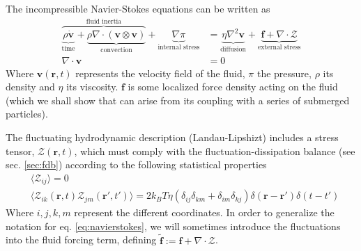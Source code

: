 \documentclass[ twoside,openright,titlepage,numbers=noenddot,%
headinclude,footinclude,cleardoublepage=empty,abstract=on,
BCOR=5mm,paper=a4,fontsize=11pt, dvipsnames
]{scrreprt}
\renewcommand{\vec}[1]{\bm{#1}}
\newcommand{\kT}{k_B T}
\newcommand{\fpos}{r}
\newcommand{\fvel}{v}
\begin{document}
The incompressible Navier-Stokes equations can be written as
\begin{equation}
  \label{eq:navierstokes}
  \begin{aligned}
    \overbrace{\underbrace{\rho\dot{\vec{\fvel}}}_{\text{time}} +\underbrace{\rho\nabla\cdot (\vec{\fvel}\otimes\vec{\fvel})}_{\text{convection}}}^{\text{fluid inertia}} + \underbrace{\nabla \pi}_{\text{internal stress}} &= \underbrace{\eta \nabla^2\vec{\fvel}}_{\text{diffusion}} + \underbrace{\vec{f} + \nabla\cdot \mathcal{Z}}_{\text{external stress}}\\
    \nabla\cdot\vec{\fvel} &= 0
  \end{aligned}
\end{equation}
Where $\vec{\fvel}(\vec{\fpos}, t)$ represents the velocity field of the fluid, $\pi$ the pressure, $\rho$ its density and $\eta$ its viscosity. $\vec{f}$ is some localized force density acting on the fluid (which we shall show that can arise from its coupling with a series of submerged particles).

The fluctuating hydrodynamic description (Landau-Lipshizt) includes a stress tensor, $\mathcal{Z}(\vec{\fpos}, t)$, which must comply with the fluctuation-dissipation balance (see sec. \ref{sec:fdb}) according to the following statistical properties\cite{Zarate2006}
\begin{equation}
  \begin{aligned}
&  \langle \mathcal Z_{ij}\rangle = 0\\
&  \langle \mathcal Z_{ik}(\vec{\fpos},t)\mathcal Z_{jm}(\vec{\fpos}',t')\rangle = 2\kT\eta(\delta_{ij}\delta_{km} + \delta_{im}\delta_{kj})\delta(\vec{\fpos}-\vec{\fpos}')\delta(t-t')
\end{aligned}
\end{equation}
Where $i,j,k,m$ represent the different coordinates.
In order to generalize the notation for eq. \eqref{eq:navierstokes}, we will sometimes introduce the fluctuations into the fluid forcing term, defining $\tilde{\vec{f}} := \vec{f} + \nabla\cdot\mathcal{Z}$.
\end{document}
